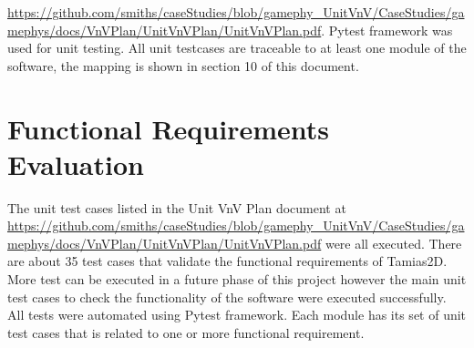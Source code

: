 \documentclass[12pt, titlepage]{article}
\newcommand{\progname}{Tamias2D}
\begin{document}
\url{https://github.com/smiths/caseStudies/blob/gamephy_UnitVnV/CaseStudies/gamephys/docs/VnVPlan/UnitVnVPlan/UnitVnVPlan.pdf}. Pytest framework was used for unit testing. All unit testcases are traceable to at least one module of the software, the mapping is shown in section 10 of this document.


\section{Functional Requirements Evaluation}
The unit test cases listed in the Unit VnV Plan document at \url{https://github.com/smiths/caseStudies/blob/gamephy_UnitVnV/CaseStudies/gamephys/docs/VnVPlan/UnitVnVPlan/UnitVnVPlan.pdf} were all executed. There are about 35 test cases that validate the functional requirements of \progname . More test can be executed in a future phase of this project however the main unit test cases to check the functionality of the software were executed successfully. All tests were automated using Pytest framework. Each module has its set of unit test cases that is related to one or more functional requirement.
\end{document}
